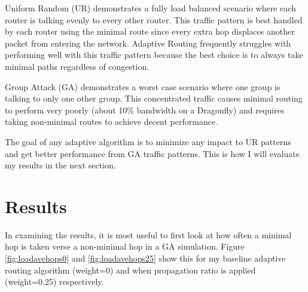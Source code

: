 \documentclass[conference,12pt]{IEEEtran}
\begin{document}
Uniform Random (UR) demonstrates a fully load balanced scenario where each router is talking evenly to every other router. This traffic pattern is best handled by each router using the minimal route since every extra hop displaces another packet from entering the network. Adaptive Routing frequently struggles with performing well with this traffic pattern because the best choice is to always take minimal paths regardless of congestion.

Group Attack (GA) demonstrates a worst case scenario where one group is talking to only one other group. This concentrated traffic causes minimal routing to perform very poorly (about 10\% bandwidth on a Dragonfly) and requires taking non-minimal routes to achieve decent performance. 

The goal of any adaptive algorithm is to minimize any impact to UR patterns and get better performance from GA traffic patterns. This is how I will evaluate my results in the next section.


\section{Results}

In examining the results, it is most useful to first look at how often a minimal hop is taken verse a non-minimal hop in a GA simulation. Figure \ref{fig:loadavehops0} and \ref{fig:loadavehops25} show this for my baseline adaptive routing algorithm (weight=0) and when propagation ratio is applied (weight=0.25) respectively.
\end{document}
